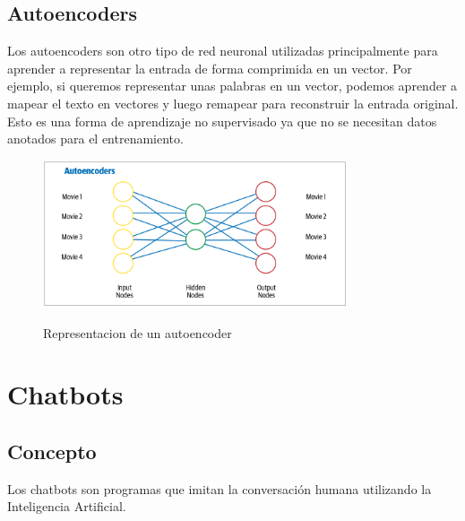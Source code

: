 \subsection{Autoencoders}
Los autoencoders son otro tipo de red neuronal utilizadas principalmente para aprender a
representar la
entrada de forma comprimida en un vector. Por ejemplo, si queremos representar unas palabras en un
vector,
podemos aprender a mapear el texto en vectores y luego remapear para reconstruir la entrada
original.
Esto es una forma de aprendizaje no supervisado ya que no se necesitan datos anotados para el
entrenamiento.\\

\begin{figure}[H]
	\centering
	\includegraphics[width=0.8\textwidth]{imagenes/Cap 2/autoencoder.png}
	\caption{Representacion de un autoencoder}
	\label{fig:autoencoder}
	\cite{sowmya_practical_npl}
\end{figure}



\section{Chatbots}







\subsection{Concepto}
Los chatbots son programas que imitan la conversación humana utilizando la Inteligencia
Artificial.\cite{UniversityRelatedFAQS}

